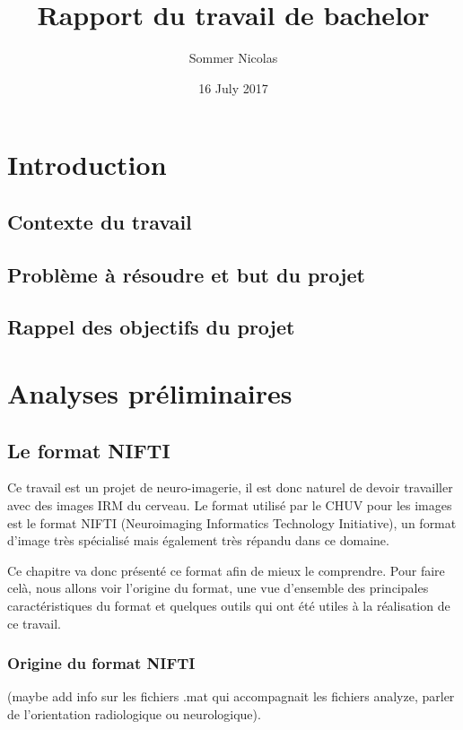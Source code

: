 \documentclass[a4paper,10pt,openany,oneside]{sphinxmanual}
\title{Rapport du travail de bachelor}
\date{16 July 2017}
\author{Sommer Nicolas}
\begin{document}
\maketitle
\tableofcontents
{}\label{index::doc}



\chapter{Introduction}
\label{index:introduction}\label{index:rapport-du-travail-de-bachelor}

\section{Contexte du travail}
\label{index:contexte-du-travail}

\section{Problème à résoudre et but du projet}
\label{index:probleme-a-resoudre-et-but-du-projet}

\section{Rappel des objectifs du projet}
\label{index:rappel-des-objectifs-du-projet}

\chapter{Analyses préliminaires}
\label{index:analyses-preliminaires}

\section{Le format NIFTI}
\label{index:le-format-nifti}
Ce travail est un projet de neuro-imagerie, il est donc naturel de devoir travailler avec des
images IRM du cerveau. Le format utilisé par le CHUV pour les images est le format NIFTI
(Neuroimaging Informatics Technology Initiative), un format d'image très spécialisé mais
également très répandu dans ce domaine.

Ce chapitre va donc présenté ce format afin de mieux le comprendre. Pour faire celà, nous
allons voir l'origine du format, une vue d'ensemble des principales caractéristiques du format
et quelques outils qui ont été utiles à la réalisation de ce travail.


\subsection{Origine du format NIFTI}
\label{index:origine-du-format-nifti}
(maybe add info sur les fichiers .mat qui accompagnait les fichiers analyze, parler de l'orientation
radiologique ou neurologique).
\end{document}
